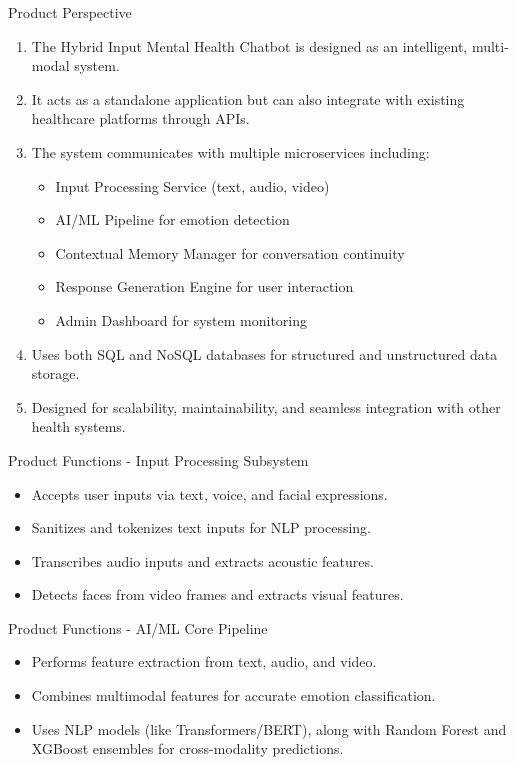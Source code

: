 \documentclass{beamer}
\begin{document}
\begin{frame}{Product Perspective}
    \justifying
    \begin{enumerate}
        \item The Hybrid Input Mental Health Chatbot is designed as an intelligent, multi-modal system.
        \item It acts as a standalone application but can also integrate with existing healthcare platforms through APIs.
        \item The system communicates with multiple microservices including:
        \begin{itemize}
            \item Input Processing Service (text, audio, video)
            \item AI/ML Pipeline for emotion detection
            \item Contextual Memory Manager for conversation continuity
            \item Response Generation Engine for user interaction
            \item Admin Dashboard for system monitoring
        \end{itemize}
        \item Uses both SQL and NoSQL databases for structured and unstructured data storage.
        \item Designed for scalability, maintainability, and seamless integration with other health systems.
    \end{enumerate}
\end{frame}

\begin{frame}{Product Functions - Input Processing Subsystem}
\begin{itemize}
    \item Accepts user inputs via text, voice, and facial expressions.
    \item Sanitizes and tokenizes text inputs for NLP processing.
    \item Transcribes audio inputs and extracts acoustic features.
    \item Detects faces from video frames and extracts visual features.
\end{itemize}
\end{frame}

\begin{frame}{Product Functions - AI/ML Core Pipeline}
\begin{itemize}
    \item Performs feature extraction from text, audio, and video.
    \item Combines multimodal features for accurate emotion classification.
    \item Uses NLP models (like Transformers/BERT), along with Random Forest and XGBoost ensembles for cross-modality predictions.
\end{itemize}
\end{frame}
\end{document}
